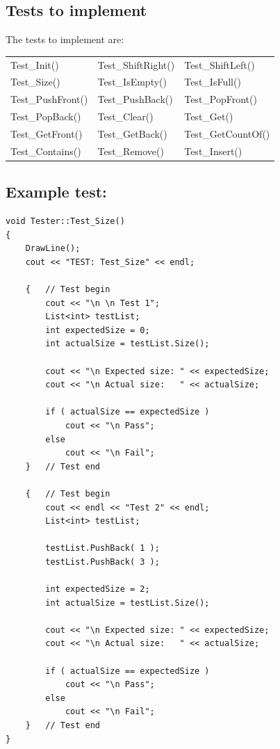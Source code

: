     \subsection{Tests to implement}

    The tests to implement are:

    \begin{center}
        \begin{tabular}{p{4cm} p{4cm} p{4cm} }
        Test\_Init() &
        Test\_ShiftRight() &
        Test\_ShiftLeft()
        \\
        Test\_Size() &
        Test\_IsEmpty() &
        Test\_IsFull()
        \\
        Test\_PushFront() &
        Test\_PushBack() &
        Test\_PopFront()
        \\
        Test\_PopBack() &
        Test\_Clear() &
        Test\_Get()
        \\
        Test\_GetFront() &
        Test\_GetBack() &
        Test\_GetCountOf()
        \\
        Test\_Contains() &
        Test\_Remove() &
        Test\_Insert()
        \end{tabular}
    \end{center}

\subsection{Example test:}

\begin{lstlisting}[style=code]
void Tester::Test_Size()
{
    DrawLine();
    cout << "TEST: Test_Size" << endl;

    {   // Test begin
        cout << "\n \n Test 1";
        List<int> testList;
        int expectedSize = 0;
        int actualSize = testList.Size();

        cout << "\n Expected size: " << expectedSize;
        cout << "\n Actual size:   " << actualSize;

        if ( actualSize == expectedSize )
            cout << "\n Pass";
        else
            cout << "\n Fail";
    }   // Test end

    {   // Test begin
        cout << endl << "Test 2" << endl;
        List<int> testList;

        testList.PushBack( 1 );
        testList.PushBack( 3 );

        int expectedSize = 2;
        int actualSize = testList.Size();

        cout << "\n Expected size: " << expectedSize;
        cout << "\n Actual size:   " << actualSize;

        if ( actualSize == expectedSize )
            cout << "\n Pass";
        else
            cout << "\n Fail";
    }   // Test end
}
\end{lstlisting}

